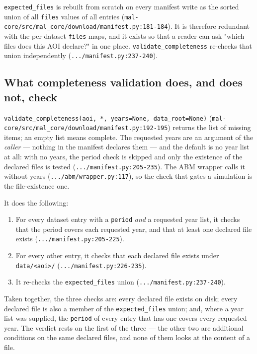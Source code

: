 \documentclass[11pt,a4paper]{article}
\newcommand{\code}[1]{\texttt{#1}}
\begin{document}
\code{expected\_files} is rebuilt from scratch on every manifest write as the
sorted union of all \code{files} values of all entries
(\code{mal-core/src/mal\_core/download/manifest.py:181-184}). It is therefore
redundant with the per-dataset \code{files} maps, and it exists so that a
reader can ask "which files does this AOI declare?" in one place.
\code{validate\_completeness} re-checks that union independently
(\code{.../manifest.py:237-240}).

\subsection{What completeness validation does, and does not, check}

\code{validate\_completeness(aoi, *, years=None, data\_root=None)}
(\code{mal-core/src/mal\_core/download/manifest.py:192-195}) returns the list
of missing items; an empty list means complete. The requested years are an
argument of the \emph{caller} --- nothing in the manifest declares them ---
and the default is no year list at all: with no years, the period check is
skipped and only the existence of the declared files is tested
(\code{.../manifest.py:205-235}). The ABM wrapper calls it without years
(\code{.../abm/wrapper.py:117}), so the check that gates a simulation is
the file-existence one.

It does the following:

\begin{enumerate}
\item For every dataset entry with a \code{period} \emph{and} a requested
year list, it checks that the period covers each requested year, and that at
least one declared file exists
(\code{.../manifest.py:205-225}).
\item For every other entry, it checks that each declared file exists under
\code{data/<aoi>/} (\code{.../manifest.py:226-235}).
\item It re-checks the \code{expected\_files} union
(\code{.../manifest.py:237-240}).
\end{enumerate}

Taken together, the three checks are: every declared file exists on disk;
every declared file is also a member of the \code{expected\_files} union;
and, where a year list was supplied, the \code{period} of every entry that
has one covers every requested year. The verdict rests on the first of the
three --- the other two are additional conditions on the same declared
files, and none of them looks at the content of a file.
\end{document}
